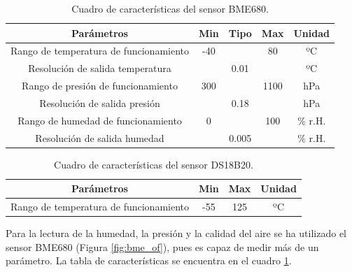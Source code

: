 \begin{table}[H]
\begin{center}
\begin{tabular}{|c|c|c|c|c|}
\hline
\textbf{Parámetros} & \textbf{Min}  & \textbf{Tipo}  & \textbf{Max}  & \textbf{Unidad}\\
\hline
Rango de temperatura de funcionamiento & -40 &  & 80 & ºC \\
Resolución de salida temperatura &  & 0.01 &  &ºC \\
Rango de presión de funcionamiento & 300 &  & 1100 & hPa \\
Resolución de salida presión &  & 0.18 &  &hPa \\
Rango de humedad de funcionamiento & 0 &  & 100 & \% r.H. \\
Resolución de salida humedad &  & 0.005 &  &\% r.H.  \\
\hline
\end{tabular}
\caption{Cuadro de características del sensor BME680.}
\label{cuadro:bme_tabla}
\end{center}
\end{table}

\begin{table}[H]
\begin{center}
\begin{tabular}{|c|c|c|c|}
\hline
\textbf{Parámetros} & \textbf{Min} & \textbf{Max}  & \textbf{Unidad}\\
\hline
Rango de temperatura de funcionamiento  & -55 & 125 & ºC \\
\hline
\end{tabular}
\caption{Cuadro de características del sensor DS18B20.}
\label{cuadro:ds_tabla}
\end{center}
\end{table}

Para la lectura de la humedad, la presión y la calidad del aire se ha utilizado el sensor BME680 (Figura \ref{fig:bme_of}), pues es capaz de medir más de un parámetro. La tabla de características se encuentra en el cuadro \ref{cuadro:bme_tabla}.\\

